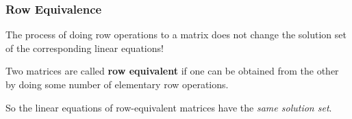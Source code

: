 \begin{frame}
\frametitle{Row Equivalence}

\begin{bluebox}[Important]{.7\textwidth}
  The process of doing row operations to a matrix does not change the solution
  set of the corresponding linear equations!
\end{bluebox}

\pause

\vfill

\begin{defn}
  Two matrices are called \textbf{row equivalent} if one can be obtained from
  the other by doing some number of elementary row operations.
\end{defn}

\pause\bigskip
So the linear equations of row-equivalent matrices have the
\emph{same solution set}.

\vfill

\end{frame}



